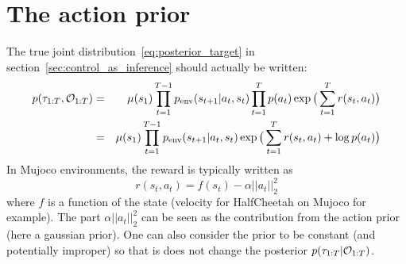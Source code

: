 \section{The action prior}
\label{app:action_prior}

The true joint distribution~\ref{eq:posterior_target} in section~\ref{sec:control_as_inference} should actually be written:
\begin{eqnarray*}
\label{eq:true_posterior_target}
p(\tau_{1:T}, {\mathcal{O}}_{1:T}) &=& \mu(s_1) \prod_{t=1}^{T-1} p_{\text{env}}(s_{t+1}|a_t, s_t) \prod_{t=1}^{T} p(a_t) \exp\big(\sum_{t=1}^{T} r(s_t, a_t)\big) \\
&=& \mu(s_1) \prod_{t=1}^{T-1} p_{\text{env}}(s_{t+1}|a_t, s_t)\exp\big(\sum_{t=1}^{T} r(s_t, a_t) + \log p(a_t)\big) \\
\end{eqnarray*}
In Mujoco environments, the reward is typically written as 
$$r(s_t, a_t) = f(s_t) - \alpha ||a_t||_2^2 $$
where $f$ is a function of the state (velocity for HalfCheetah on Mujoco for example). The part $\alpha ||a_t||_2^2$ can be seen as the contribution from the action prior (here a gaussian prior).
One can also consider the prior to be constant (and potentially improper) so that is does not change the posterior $p(\tau_{1:T}| {\mathcal{O}}_{1:T})$.



